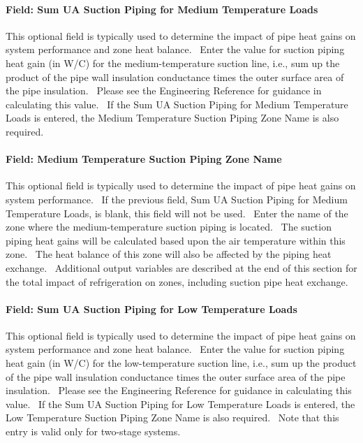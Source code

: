 \paragraph{Field: Sum UA Suction Piping for Medium Temperature Loads}\label{field-sum-ua-suction-piping-for-medium-temperature-loads}

This optional field is typically used to determine the impact of pipe heat gains on system performance and zone heat balance.~ Enter the value for suction piping heat gain (in W/C) for the medium-temperature suction line, i.e., sum up the product of the pipe wall insulation conductance times the outer surface area of the pipe insulation.~ Please see the Engineering Reference for guidance in calculating this value.~ If the Sum UA Suction Piping for Medium Temperature Loads is entered, the Medium Temperature Suction Piping Zone Name is also required.

\paragraph{Field: Medium Temperature Suction Piping Zone Name}\label{field-medium-temperature-suction-piping-zone-name}

This optional field is typically used to determine the impact of pipe heat gains on system performance.~ If the previous field, Sum UA Suction Piping for Medium Temperature Loads, is blank, this field will not be used.~ Enter the name of the zone where the medium-temperature suction piping is located.~ The suction piping heat gains will be calculated based upon the air temperature within this zone.~ The heat balance of this zone will also be affected by the piping heat exchange.~ Additional output variables are described at the end of this section for the total impact of refrigeration on zones, including suction pipe heat exchange.

\paragraph{Field: Sum UA Suction Piping for Low Temperature Loads}\label{field-sum-ua-suction-piping-for-low-temperature-loads}

This optional field is typically used to determine the impact of pipe heat gains on system performance and zone heat balance.~ Enter the value for suction piping heat gain (in W/C) for the low-temperature suction line, i.e., sum up the product of the pipe wall insulation conductance times the outer surface area of the pipe insulation.~ Please see the Engineering Reference for guidance in calculating this value.~ If the Sum UA Suction Piping for Low Temperature Loads is entered, the Low Temperature Suction Piping Zone Name is also required.~ Note that this entry is valid only for two-stage systems.

